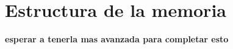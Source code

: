 \section{Estructura de la memoria}
\textbf{esperar a tenerla mas avanzada para completar esto}











